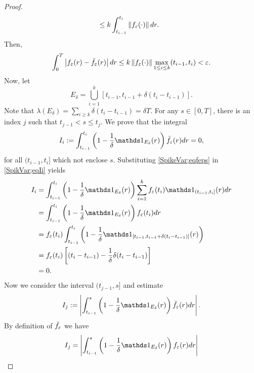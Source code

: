 \begin{proof}
\begin{align*}
        &\leq 
            k\int_{t_{i-1}}^{t_i}\left\lVert f_{\varepsilon}(\cdot)\right\rVert dr.
    \end{align*}
    Then,
    \begin{equation*}
        \int_{0}^{T}\abs{f_{\veps}(r) - \Bar{f}_{\veps}(r)}dr \leq %
        k \norm{f_{\veps}(\cdot)} \max_{1\leq i \leq k}(t_{i-1},t_i) < \veps.
    \end{equation*}
    Now, let
    \begin{equation}
        E_{\delta} = \bigcup_{i=1}^{k}[t_{i-1}, t_{i-1} + \delta(t_i - t_{i-1})].
    \end{equation}
    Note that $\lambda(E_{\delta}) = \sum_{i\geq k}\delta(t_i - t_{i-1}) = \delta T$.
    For any $s \in [0,T]$, there is an index $j$ such that $t_{j-1} < s \leq t_j$. 
    We prove that the integral 
    \begin{equation}\label{SpikVar;eqIi}
        I_{i} := \int_{t_{i-1}}^{t_i}\left(1 - \dfrac{1}{\delta} \ind_{E_{\delta}}(r)\right)%
        \Bar{f}_{\veps}(r)dr = 0,
    \end{equation}
    for all $(t_{i-1},t_i]$ which not enclose $s$. Substituting \cref{SpikeVar;eqfeps}
    in \cref{SpikVar;eqIi} yields
    \begin{align*}
        I_i &= \int_{t_{i-1}}^{t_i}\left(1 - \frac{1}{\delta} \ind_{E_{\delta}}(r)\right)%
                \sum_{i=1}^{k}f_{\veps}(t_i)\ind_{(t_{i-1},t_i]}(r) dr \\
            &= \int_{t_{i-1}}^{t_i}\left(1 - \frac{1}{\delta} \ind_{E_{\delta}}(r)\right)%
                f_{\veps}(t_i) dr \\
            &= f_{\veps}(t_i) \int_{t_{i-1}}^{t_i}\left(1 - \frac{1}{\delta} %
                \ind_{[t_{i-1}, t_{i-1} + \delta (t_i - t_{i-1})]}(r)\right) \\
            &= f_{\veps}(t_i)\left[(t_i - t_{i-1}) - \frac{1}{\delta}%
                \delta (t_i - t_{i-1})\right] \\
            &= 0.
    \end{align*}
    Now we consider the interval $(t_{j-1}, s]$ and estimate
    \begin{equation*}
        I_{j} := \abs{\int_{t_{i-1}}^{s} \left(1 - \frac{1}{\delta}%
                 \ind_{E_{\delta}}(r)\right) \Bar{f}_{\veps}(r) dr}.
    \end{equation*}
    By definition of $\Bar{f}_{\varepsilon}$ we have
    \begin{align*}
        I_{j} &= \abs{\int_{t_{i-1}}^{s} \left(1 - \frac{1}{\delta}%
                \ind_{E_{\delta}}(r)\right) f_{\veps}(r) dr}\\

\end{align*}
\end{proof}
